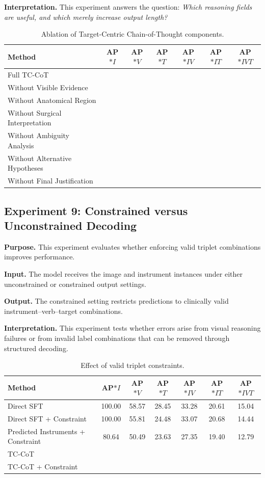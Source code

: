 \documentclass[11pt]{article}
\begin{document}
\textbf{Interpretation.}
This experiment answers the question: \emph{Which reasoning fields are useful, and which merely increase output length?}

\begin{table}[H]
\centering
\caption{Ablation of Target-Centric Chain-of-Thought components.}
\begin{tabular}{lcccccc}
\toprule
Method & AP$*I$ & AP$*V$ & AP$*T$ & AP$*{IV}$ & AP$*{IT}$ & AP$*{IVT}$ \\
\midrule
Full TC-CoT & & & & & & \\
Without Visible Evidence & & & & & & \\
Without Anatomical Region & & & & & & \\
Without Surgical Interpretation & & & & & & \\
Without Ambiguity Analysis & & & & & & \\
Without Alternative Hypotheses & & & & & & \\
Without Final Justification & & & & & & \\
\bottomrule
\end{tabular}
\label{tab:reasoning_components}
\end{table}

\subsection{Experiment 9: Constrained versus Unconstrained Decoding}

\textbf{Purpose.}
This experiment evaluates whether enforcing valid triplet combinations improves performance.

\textbf{Input.}
The model receives the image and instrument instances under either unconstrained or constrained output settings.

\textbf{Output.}
The constrained setting restricts predictions to clinically valid instrument--verb--target combinations.

\textbf{Interpretation.}
This experiment tests whether errors arise from visual reasoning failures or from invalid label combinations that can be removed through structured decoding.

\begin{table}[H]
\centering
\caption{Effect of valid triplet constraints.}
\begin{tabular}{lcccccc}
\toprule
Method & AP$*I$ & AP$*V$ & AP$*T$ & AP$*{IV}$ & AP$*{IT}$ & AP$*{IVT}$ \\
\midrule
Direct SFT & 100.00 & 58.57 & 28.45 & 33.28 & 20.61 & 15.04 \\
Direct SFT + Constraint & 100.00 & 55.81 & 24.48 & 33.07 & 20.68 & 14.44 \\
Predicted Instruments + Constraint & 80.64 & 50.49 & 23.63 & 27.35 & 19.40 & 12.79 \\
TC-CoT & & & & & & \\
TC-CoT + Constraint & & & & & & \\
\bottomrule
\end{tabular}
\label{tab:constraints}
\end{table}
\end{document}

